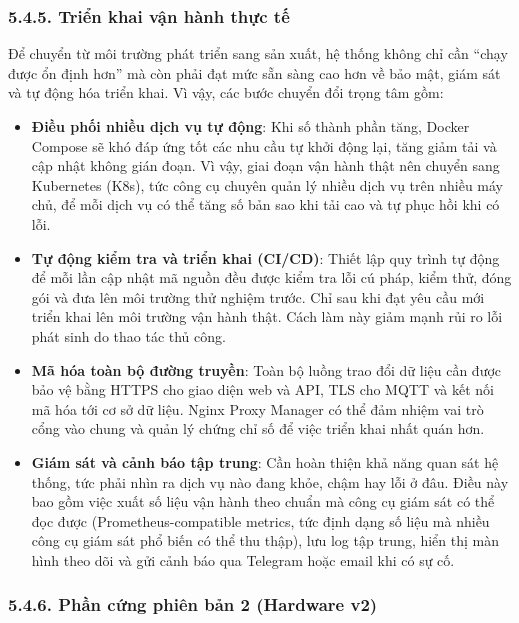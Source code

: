 \documentclass[a4paper]{extarticle}
\providecommand{\tightlist}{%
  \setlength{\itemsep}{0pt}\setlength{\parskip}{0pt}}
\begin{document}
\subsubsection{5.4.5. Triển khai vận hành thực tế}\label{545-triux1ec3n-khai-sux1ea3n-xuux1ea5t-production-deployment}

Để chuyển từ môi trường phát triển sang sản xuất, hệ thống không chỉ cần
``chạy được ổn định hơn'' mà còn phải đạt mức sẵn sàng cao hơn về bảo
mật, giám sát và tự động hóa triển khai. Vì vậy, các bước chuyển đổi
trọng tâm gồm:

\begin{itemize}
\tightlist
\item
  \textbf{Điều phối nhiều dịch vụ tự động}: Khi số thành phần tăng,
  Docker Compose sẽ khó đáp ứng tốt các nhu cầu tự khởi động lại, tăng
  giảm tải và cập nhật không gián đoạn. Vì vậy, giai đoạn vận hành thật nên
  chuyển sang Kubernetes (K8s), tức công cụ chuyên quản lý nhiều dịch vụ
  trên nhiều máy chủ, để mỗi dịch vụ có thể tăng số bản sao khi tải cao
  và tự phục hồi khi có lỗi.
\item
  \textbf{Tự động kiểm tra và triển khai (CI/CD)}: Thiết lập quy trình
  tự động để mỗi lần cập nhật mã nguồn đều được kiểm tra lỗi cú pháp,
  kiểm thử, đóng gói và đưa lên môi trường thử nghiệm trước. Chỉ sau khi
  đạt yêu cầu mới triển khai lên môi trường vận hành thật. Cách làm này giảm mạnh rủi
  ro lỗi phát sinh do thao tác thủ công.
\item
  \textbf{Mã hóa toàn bộ đường truyền}: Toàn bộ luồng trao đổi dữ liệu
  cần được bảo vệ bằng HTTPS cho giao diện web và API, TLS cho MQTT và
  kết nối mã hóa tới cơ sở dữ liệu. Nginx Proxy Manager có thể đảm nhiệm
  vai trò cổng vào chung và quản lý chứng chỉ số để việc triển khai nhất
  quán hơn.
\item
  \textbf{Giám sát và cảnh báo tập trung}: Cần hoàn thiện khả năng quan
  sát hệ thống, tức phải nhìn ra dịch vụ nào đang khỏe, chậm hay lỗi ở
  đâu. Điều này bao gồm việc xuất số liệu vận hành theo chuẩn mà công cụ
  giám sát có thể đọc được (Prometheus-compatible metrics, tức định dạng
  số liệu mà nhiều công cụ giám sát phổ biến có thể thu thập), lưu log tập
  trung, hiển thị màn hình theo dõi và gửi cảnh báo qua Telegram hoặc
  email khi có sự cố.
\end{itemize}

\subsubsection{5.4.6. Phần cứng phiên bản 2 (Hardware
v2)}\label{546-phux1ea7n-cux1ee9ng-phiuxean-bux1ea3n-2-hardware-v2}
\end{document}
